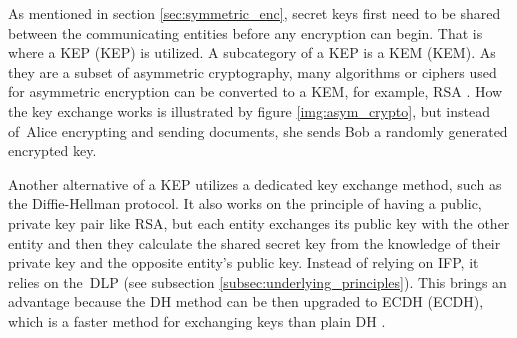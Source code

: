As mentioned in section \ref{sec:symmetric_enc}, secret keys first need to be shared between the communicating entities before any encryption can begin. That is where a KEP (\acl{KEP}) is utilized. A subcategory of a KEP is a KEM (\acl{KEM}). As they are a subset of asymmetric cryptography, many algorithms or ciphers used for asymmetric encryption can be converted to a KEM, for example, RSA \cite{Ristic2014}. How the key exchange works is illustrated by figure \ref{img:asym_crypto}, but instead of~Alice encrypting and sending documents, she sends Bob a randomly generated encrypted key.

Another alternative of a KEP utilizes a dedicated key exchange method, such as the Diffie-Hellman protocol. It also works on the principle of having a public, private key pair like RSA, but each entity exchanges its public key with the other entity and then they calculate the shared secret key from the knowledge of their private key and the opposite entity's public key. Instead of relying on IFP, it relies on the~DLP (see subsection \ref{subsec:underlying_principles}). This brings an advantage because the DH method can be then upgraded to \acl{ECDH} (ECDH), which is a faster method for exchanging keys than plain DH \cite{Ristic2014}.
